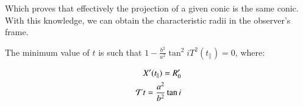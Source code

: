 Which proves that effectively the projection of a given conic is the same conic. With this knowledge, we can obtain the characteristic radii in
the observer's frame.

The minimum value of $t$ is such that $1-\frac{b^2}{a^2}\tan^2 i T^2(t_\parallel) =0$, where:

\begin{align}
X'(t_\parallel) = R'_0 \\
\mathcal{T} t = \frac{a^2}{b^2}\tan i
\end{align}



